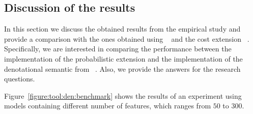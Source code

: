 
\subsection{Discussion of the results}
\label{sec:stat:impl:comp}

In this section we discuss the obtained results from the empirical study and
provide a comparison with the ones obtained using \fodaPA~\cite{acl13}
and the cost extension \fodaPAc~\cite{clc16}. Specifically, we are interested in 
comparing the performance between the implementation of the probabilistic 
extension and the implementation of the denotational semantic from 
\fodaPA~\cite{acl13}. Also, we provide the answers for the research questions.

Figure~\ref{figure:tool:den:benchmark} shows the results of an experiment using
models containing different number of features, which ranges from $50$ to $300$.

